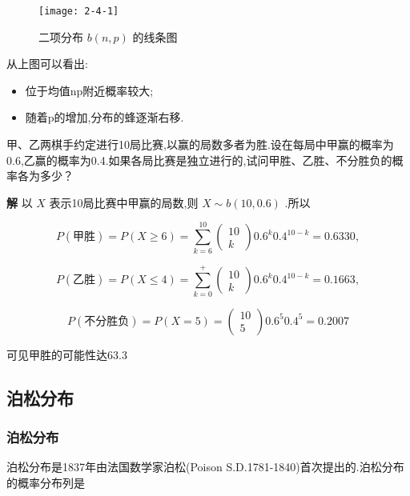 \begin{figure}
	\centering
	\texttt{[image: 2-4-1]}
	\caption{二项分布 $ b(n,p) $ 的线条图}
	\label{fig:2-4-1}
\end{figure}

从上图可以看出:
\begin{itemize}
	\item 位于均值np附近概率较大;
	\item 随着p的增加,分布的蜂逐渐右移.
\end{itemize}

\begin{example}
	甲、乙两棋手约定进行10局比赛,以赢的局数多者为胜.设在每局中甲赢的概率为0.6,乙赢的概率为0.4.如果各局比赛是独立进行的,试问甲胜、乙胜、不分胜负的概率各为多少？
	
	\textbf{解} 以 $ X $ 表示10局比赛中甲赢的局数,则 $ X \sim b(10,0.6) $ .所以
	
	\[
	P(\text{甲胜})= P(X \geqslant 6)=\sum_{k=6}^{10} \left( 
	\begin{array}{l}{10} \\ 
	{k}
	\end{array}
	\right) 
	0.6^{k} 0.4^{10-k}=0.6330 ,
	\]
	
	\[
	P(\text{乙胜}) =P(X \leqslant 4)=\sum_{k=0}^{+} \left( 
	\begin{array}{c}{10} \\ 
	{k}
	\end{array}
	\right) 
	0.6^{k} 0.4^{10-k}=0.1663 ,
	\]
	
	\[
	P(\text{不分胜负})=P(X=5)=\left( \begin{array}{c}{10} \\ {5}\end{array}\right) 0.6^{5} 0.4^{5}=0.2007
	\]
	
	可见甲胜的可能性达63.3%
\end{example}

\subsection{泊松分布}

\subsubsection{泊松分布}

泊松分布是1837年由法国数学家泊松(Poison S.D.1781-1840)首次提出的.泊松分布的概率分布列是

